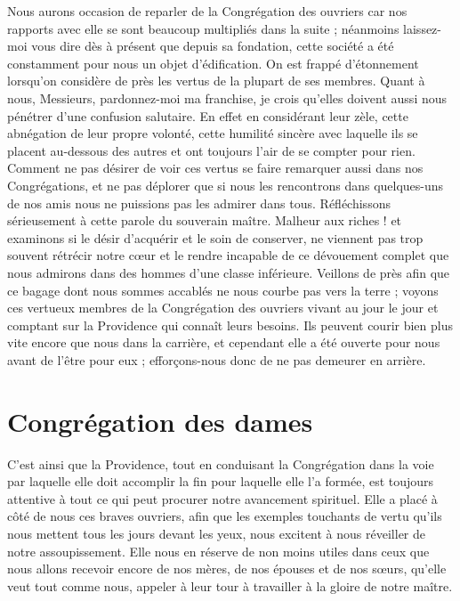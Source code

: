 Nous aurons occasion de reparler de la Congrégation des ouvriers car nos rapports avec elle se sont beaucoup multipliés dans la suite ; néanmoins laissez-moi vous dire dès à présent que depuis sa fondation, cette société a été constamment pour nous un objet d'édification. On est frappé d'étonnement lorsqu'on considère de près les vertus de la plupart de ses membres. Quant à nous, Messieurs, pardonnez-moi ma franchise, je crois qu'elles doivent aussi nous pénétrer d'une confusion salutaire. En effet en considérant leur zèle, cette abnégation de leur propre volonté, cette humilité sincère avec laquelle ils se placent au-dessous des autres et ont toujours l'air de se compter pour rien. Comment ne pas désirer de voir ces vertus se faire remarquer aussi dans nos Congrégations, et ne pas déplorer que si nous les rencontrons dans quelques-uns de nos amis nous ne puissions pas les admirer dans tous. Réfléchissons sérieusement à cette parole du souverain maître. Malheur aux riches ! et examinons si le désir d'acquérir et le soin de conserver, ne viennent pas trop souvent rétrécir notre cœur et le rendre incapable de ce dévouement complet que nous admirons dans des hommes d'une classe inférieure. Veillons de près afin que ce bagage dont nous sommes accablés ne nous courbe pas vers la terre ; voyons ces vertueux membres de la Congrégation des ouvriers vivant au jour le jour et comptant sur la Providence qui connaît leurs besoins. Ils peuvent courir bien plus vite encore que nous dans la carrière, et cependant elle a été ouverte pour nous avant de l'être pour eux ; efforçons-nous donc de ne pas
demeurer en arrière.

\section*{Congrégation des dames}
C'est ainsi que la Providence, tout en conduisant la Congrégation dans la voie par laquelle elle doit accomplir la fin pour laquelle elle l'a formée, est toujours attentive à tout ce qui peut procurer notre avancement spirituel. Elle a placé à côté de nous ces braves ouvriers, afin que les exemples touchants de vertu qu'ils nous mettent tous les jours devant les yeux, nous excitent à nous réveiller de notre assoupissement. Elle nous en réserve de non moins utiles dans ceux que nous allons recevoir encore de nos mères, de nos épouses et de nos sœurs, qu'elle veut tout comme nous, appeler à leur tour à travailler à la gloire de notre maître.

